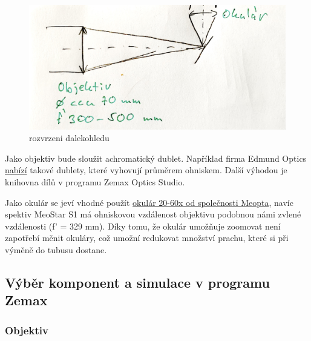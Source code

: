 \documentclass[
]{article}
\begin{document}
\begin{figure}
\centering
\includegraphics{imgs/rozvrzeni.jpeg}
\caption{rozvrzeni dalekohledu}
\end{figure}

Jako objektiv bude sloužit achromatický dublet. Například firma Edmund
Optics
\href{https://www.edmundoptics.com/c/achromatic-lenses/652/\#29374=29374_s\%3ANS4wMCAtIDUuOTk1\&29374=29374_s\%3ANC4wMCAtIDQuOTk1\&27560=27560_s\%3AVklTIDAmZGVnOyAoNDI1LTY3NW5tKQ2\&27560=27560_s\%3AVklTLU5JUiAoNDAwLTEwMDBubSk1\&27560=27560_s\%3ATWdGPHN1Yj4yPC9zdWI-ICg0MDAtNzAwbm0p0\&27560=27560_s\%3ATWdGPHN1Yj4yPC9zdWI-ICg0MDAtNzAwbm0p0\&27560=27560_s\%3AVklTIDAmZGVnOyAoNDI1LTY3NW5tKQ2\&27560=27560_s\%3AVklTLU5JUiAoNDAwLTEwMDBubSk1\&27560=27560_s\%3AVVYtVklTICgzNDUtNzAwbm0p0\&27614=27614_d\%3A\%5B59.18\%20TO\%2089.47\%5D}{nabízí}
takové dublety, které vyhovují průměrem ohniskem. Další výhodou je
knihovna dílů v programu Zemax Optics Studio.

Jako okulár se jeví vhodné použít
\href{https://eshop.meopta.cz/spektivy-meostar-s1/okular-20-60x/}{okulár
20-60x od společnosti Meopta}, navíc spektiv MeoStar S1 má ohniskovou
vzdálenost objektivu podobnou námi zvlené vzdálenosti (f' = 329 mm).
Díky tomu, že okulár umožňuje zoomovat není zapotřebí měnit okuláry, což
umožní redukovat množství prachu, které si při výměně do tubusu dostane.

\hypertarget{vuxfdbux11br-komponent-a-simulace-v-programu-zemax}{%
\subsection{Výběr komponent a simulace v programu
Zemax}\label{vuxfdbux11br-komponent-a-simulace-v-programu-zemax}}

\hypertarget{objektiv}{%
\subsubsection{Objektiv}\label{objektiv}}
\end{document}
